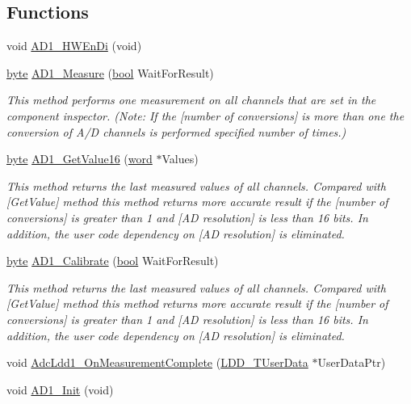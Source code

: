 \subsection*{Functions}
\begin{DoxyCompactItemize}
\item 
void \hyperlink{group___a_d1__module_ga4e331d6fe384835bec07cb2878de30c7}{A\+D1\+\_\+\+H\+W\+En\+Di} (void)
\item 
\hyperlink{group___p_e___types__module_ga0c8186d9b9b7880309c27230bbb5e69d}{byte} \hyperlink{group___a_d1__module_ga84c2908baf7bf49c540b20b5b8d14da6}{A\+D1\+\_\+\+Measure} (\hyperlink{group___p_e___types__module_ga97a80ca1602ebf2303258971a2c938e2}{bool} Wait\+For\+Result)
\begin{DoxyCompactList}\small\item\em This method performs one measurement on all channels that are set in the component inspector. (Note\+: If the \mbox{[}number of conversions\mbox{]} is more than one the conversion of A/D channels is performed specified number of times.) \end{DoxyCompactList}\item 
\hyperlink{group___p_e___types__module_ga0c8186d9b9b7880309c27230bbb5e69d}{byte} \hyperlink{group___a_d1__module_gabdd15b1c1e2b3a51eb6b1109fd0c6d75}{A\+D1\+\_\+\+Get\+Value16} (\hyperlink{group___p_e___types__module_ga285e72252c100e2508e4e933a0738f2b}{word} $\ast$Values)
\begin{DoxyCompactList}\small\item\em This method returns the last measured values of all channels. Compared with \mbox{[}Get\+Value\mbox{]} method this method returns more accurate result if the \mbox{[}number of conversions\mbox{]} is greater than 1 and \mbox{[}AD resolution\mbox{]} is less than 16 bits. In addition, the user code dependency on \mbox{[}AD resolution\mbox{]} is eliminated. \end{DoxyCompactList}\item 
\hyperlink{group___p_e___types__module_ga0c8186d9b9b7880309c27230bbb5e69d}{byte} \hyperlink{group___a_d1__module_ga3d618d37cfbbece5ca5f3b6c1cce93c5}{A\+D1\+\_\+\+Calibrate} (\hyperlink{group___p_e___types__module_ga97a80ca1602ebf2303258971a2c938e2}{bool} Wait\+For\+Result)
\begin{DoxyCompactList}\small\item\em This method returns the last measured values of all channels. Compared with \mbox{[}Get\+Value\mbox{]} method this method returns more accurate result if the \mbox{[}number of conversions\mbox{]} is greater than 1 and \mbox{[}AD resolution\mbox{]} is less than 16 bits. In addition, the user code dependency on \mbox{[}AD resolution\mbox{]} is eliminated. \end{DoxyCompactList}\item 
void \hyperlink{group___a_d1__module_ga4776d32af94d7918f74bc7377ae5351f}{Adc\+Ldd1\+\_\+\+On\+Measurement\+Complete} (\hyperlink{group___p_e___types__module_ga0b66a73f87238a782318aa0be7578e35}{L\+D\+D\+\_\+\+T\+User\+Data} $\ast$User\+Data\+Ptr)
\item 
void \hyperlink{group___a_d1__module_ga018b22b1bc9627ef871cf94bb3e3bbe1}{A\+D1\+\_\+\+Init} (void)
\end{DoxyCompactItemize}
